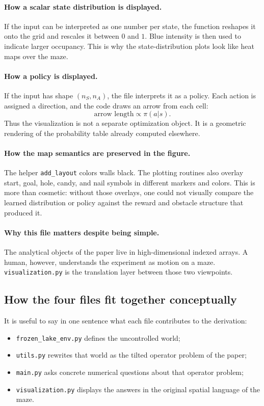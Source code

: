 \documentclass[11pt]{article}
\begin{document}
\paragraph{How a scalar state distribution is displayed.}
If the input can be interpreted as one number per state, the function reshapes it onto the
grid and rescales it between \(0\) and \(1\). Blue intensity is then used to indicate larger
occupancy. This is why the state-distribution plots look like heat maps over the maze.

\paragraph{How a policy is displayed.}
If the input has shape \((n_S,n_A)\), the file interprets it as a policy. Each action is
assigned a direction, and the code draws an arrow from each cell:
\begin{equation}
    \text{arrow length} \propto \pi(a|s).
\end{equation}
Thus the visualization is not a separate optimization object. It is a geometric rendering of
the probability table already computed elsewhere.

\paragraph{How the map semantics are preserved in the figure.}
The helper \texttt{add\_layout} colors walls black. The plotting routines also overlay start,
goal, hole, candy, and nail symbols in different markers and colors. This is more than
cosmetic: without those overlays, one could not visually compare the learned distribution or
policy against the reward and obstacle structure that produced it.

\paragraph{Why this file matters despite being simple.}
The analytical objects of the paper live in high-dimensional indexed arrays. A human, however,
understands the experiment as motion on a maze. \texttt{visualization.py} is the translation
layer between those two viewpoints.

\subsection*{How the four files fit together conceptually}

It is useful to say in one sentence what each file contributes to the derivation:
\begin{itemize}
    \item \texttt{frozen\_lake\_env.py} defines the uncontrolled world;
    \item \texttt{utils.py} rewrites that world as the tilted operator problem of the paper;
    \item \texttt{main.py} asks concrete numerical questions about that operator problem;
    \item \texttt{visualization.py} displays the answers in the original spatial language of the
    maze.
\end{itemize}
\end{document}
